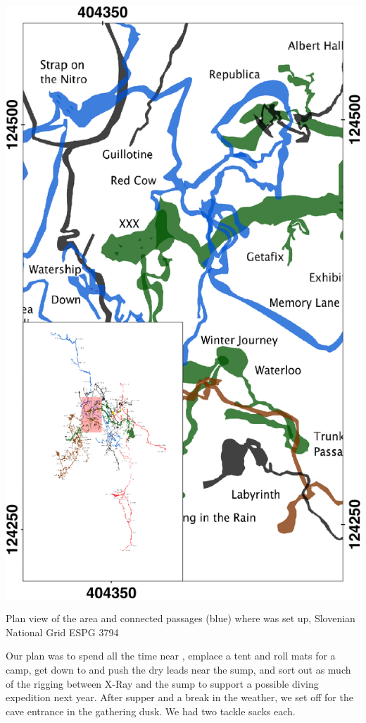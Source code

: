 \begin{marginfigure}
\checkoddpage \ifoddpage \forcerectofloat \else \forceversofloat \fi
\centering
 \includegraphics[width=\linewidth]{images/2014/jarv-2014/red_cow_inset}
 \caption{Plan view of the \protect{} area and connected passages (blue) where \protect{} was set up, Slovenian National Grid ESPG 3794}
 \label{Red Cow inset}
\end{marginfigure}


Our plan was to spend all the time near , emplace a tent and roll mats for a camp, get down to  and push the dry leads near the sump, and sort out as much of the rigging between X-Ray and the sump to support a possible diving expedition next year.
After supper and a break in the weather, we set off for the cave entrance in the gathering dusk. We had two tackle sacks each.

